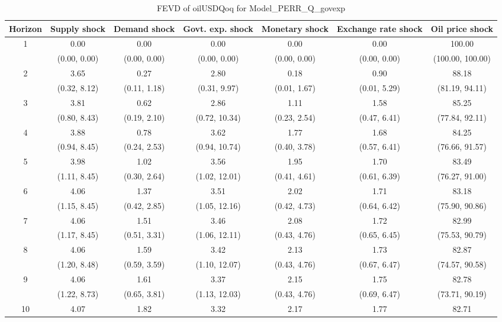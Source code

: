 \documentclass{article}
\begin{document}
\begin{table}
	\footnotesize
	\caption{FEVD of oilUSDQoq for Model_PERR_Q_govexp}
	\begin{tabular}{ccccccc}
		Horizon & Supply shock & Demand shock & Govt. exp. shock & Monetary shock & Exchange rate shock & Oil price shock\\ \hline
		\multirow{2}{*}{1} & 0.00 & 0.00 & 0.00 & 0.00 & 0.00 & 100.00\\
		 & (0.00, 0.00) & (0.00, 0.00) & (0.00, 0.00) & (0.00, 0.00) & (0.00, 0.00) & (100.00, 100.00)\\
		\multirow{2}{*}{2} & 3.65 & 0.27 & 2.80 & 0.18 & 0.90 & 88.18\\
		 & (0.32, 8.12) & (0.11, 1.18) & (0.31, 9.97) & (0.01, 1.67) & (0.01, 5.29) & (81.19, 94.11)\\
		\multirow{2}{*}{3} & 3.81 & 0.62 & 2.86 & 1.11 & 1.58 & 85.25\\
		 & (0.80, 8.43) & (0.19, 2.10) & (0.72, 10.34) & (0.23, 2.54) & (0.47, 6.41) & (77.84, 92.11)\\
		\multirow{2}{*}{4} & 3.88 & 0.78 & 3.62 & 1.77 & 1.68 & 84.25\\
		 & (0.94, 8.45) & (0.24, 2.53) & (0.94, 10.74) & (0.40, 3.78) & (0.57, 6.41) & (76.66, 91.57)\\
		\multirow{2}{*}{5} & 3.98 & 1.02 & 3.56 & 1.95 & 1.70 & 83.49\\
		 & (1.11, 8.45) & (0.30, 2.64) & (1.02, 12.01) & (0.41, 4.61) & (0.61, 6.39) & (76.27, 91.00)\\
		\multirow{2}{*}{6} & 4.06 & 1.37 & 3.51 & 2.02 & 1.71 & 83.18\\
		 & (1.15, 8.45) & (0.42, 2.85) & (1.05, 12.16) & (0.42, 4.73) & (0.64, 6.42) & (75.90, 90.86)\\
		\multirow{2}{*}{7} & 4.06 & 1.51 & 3.46 & 2.08 & 1.72 & 82.99\\
		 & (1.17, 8.45) & (0.51, 3.31) & (1.06, 12.11) & (0.43, 4.76) & (0.65, 6.45) & (75.53, 90.79)\\
		\multirow{2}{*}{8} & 4.06 & 1.59 & 3.42 & 2.13 & 1.73 & 82.87\\
		 & (1.20, 8.48) & (0.59, 3.59) & (1.10, 12.07) & (0.43, 4.76) & (0.67, 6.47) & (74.57, 90.58)\\
		\multirow{2}{*}{9} & 4.06 & 1.61 & 3.37 & 2.15 & 1.75 & 82.78\\
		 & (1.22, 8.73) & (0.65, 3.81) & (1.13, 12.03) & (0.43, 4.76) & (0.69, 6.47) & (73.71, 90.19)\\
		\multirow{2}{*}{10} & 4.07 & 1.82 & 3.32 & 2.17 & 1.77 & 82.71\\

\end{tabular}
\end{table}
\end{document}
